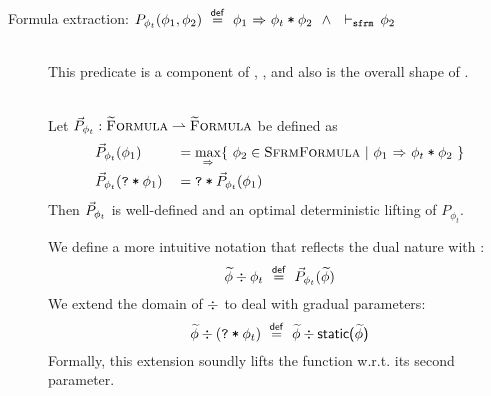 \begin{description}
    \item[Formula extraction: $P_{\phi_t}(\phi_1, \phi_2) ~\overset{\textup{\textmd{\textsf{def}}}}{=}~ {\phi_1} \,\,{\Rightarrow}\,\, {\textup{\texttt{$\phi_t$\:*\:$\phi_2$}}} ~~\wedge~~ \vdash_\texttt{sfrm}\, \phi_2$]~\\
    This predicate is a component of , ,  and also is the overall shape of .
    \begin{lemma}~\\
        Let $\vec{P}_{\phi_t} : \textup{\textsc{\ensuremath{\widetilde{\text{F}}}ormula}} \rightharpoonup \textup{\textsc{\ensuremath{\widetilde{\text{F}}}ormula}}$ be defined as
        \begin{alignat*}{2}
        & \vec{P}_{\phi_t}(\phi_1)          & &= \underset{{} \,\,{\Rightarrow}\,\, {}}{\max} \{~ \phi_2 \in \textup{\textsc{SfrmFormula}} ~|~ {\phi_1} \,\,{\Rightarrow}\,\, {\textup{\texttt{$\phi_t$\:*\:$\phi_2$}}} ~\} \\
        & \vec{P}_{\phi_t}(\textup{\texttt{\textup{\texttt{?}}\:*\:\ensuremath{\phi_1}}}) & &= \textup{\texttt{\textup{\texttt{?}}\:*\:\ensuremath{\vec{P}_{\phi_t}(\phi_1)}}}
        \end{alignat*}
        Then $\vec{P}_{\phi_t}$ is well-defined and an optimal deterministic lifting of $P_{\phi_t}$.
    \end{lemma}
    We define a more intuitive notation that reflects the dual nature with \ttt{*}:
    \begin{displaymath}
    \widetilde{\phi}\div\phi_t ~\overset{\textup{\textmd{\textsf{def}}}}{=}~ \vec{P}_{\phi_t}(\widetilde{\phi})
    \end{displaymath}
    We extend the domain of $\div$ to deal with gradual parameters:
    \begin{displaymath}
    \widetilde{\phi}\div(\textup{\texttt{\textup{\texttt{?}}\:*\:\ensuremath{\phi_t}}}) ~\overset{\textup{\textmd{\textsf{def}}}}{=}~ \widetilde{\phi}\div\textup{\textmd{\textsf{static($\widetilde{\phi}$)}}}
    \end{displaymath}
    Formally, this extension soundly lifts the function w.r.t. its second parameter.
        

\end{description}
